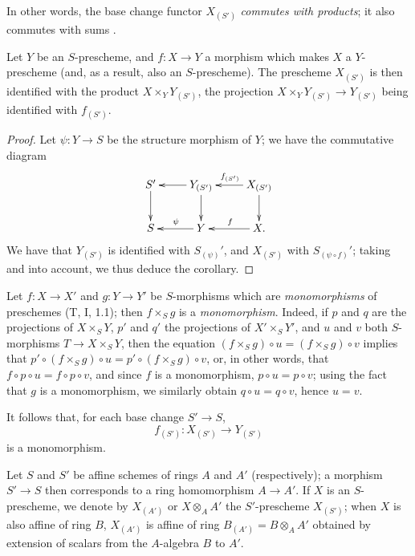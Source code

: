 In other words, the base change functor $X_{(S')}$ \emph{commutes with
products}; it also commutes with sums .

\begin{cor}[3.3.11]
\label{1.3.3.11}
Let $Y$ be an $S$-prescheme, and $f:X\to Y$ a morphism which makes $X$ a
$Y$-prescheme (and, as a result, also an $S$-prescheme). The prescheme $X_{(S')}$
is then identified with the product $X\times_Y Y_{(S')}$, the projection
$X\times_Y Y_{(S')}\to Y_{(S')}$ being identified with $f_{(S')}$.
\end{cor}

\begin{proof}
\label{proof-1.3.3.11}
Let $\psi:Y\to S$ be the structure morphism of $Y$; we have the commutative
diagram
\[
  \xymatrix{
    S'\ar[d] &
    Y_{(S')}\ar[l]\ar[d] &
    X_{(S')}\ar[l]_{f_{(S')}}\ar[d]\\
    S &
    Y\ar[l]_\psi &
    X\ar[l]_f.
  }
\]
We have that $Y_{(S')}$ is identified with $S_{(\psi)}'$, and $X_{(S')}$ with
$S_{(\psi\circ f)}'$; taking  and
 into account, we thus deduce the corollary.
\end{proof}

\begin{env}[3.3.12]
\label{1.3.3.12}
Let $f:X\to X'$ and $g:Y\to Y'$ be $S$-morphisms which are \emph{monomorphisms}
of preschemes (T, I, 1.1); then $f\times_S g$ is a \emph{monomorphism}. Indeed,
if $p$ and $q$ are the projections of $X\times_S Y$, $p'$ and $q'$ the projections of
$X'\times_S Y'$, and $u$ and $v$ both $S$-morphisms $T\to X\times_S Y$, then the
equation $(f\times_S g)\circ u=(f\times_S g)\circ v$ implies that
$p'\circ(f\times_S g)\circ u=p'\circ(f\times_S g)\circ v$, or, in other words, that
$f\circ p\circ u=f\circ p\circ v$, and since $f$ is a monomorphism,
$p\circ u=p\circ v$; using the fact that $g$ is a monomorphism, we similarly
obtain $q\circ u=q\circ v$, hence $u=v$.

It follows that, for each base change $S'\to S$,
\[
  f_{(S')}:X_{(S')}\to Y_{(S')}
\]
is a monomorphism.
\end{env}

\begin{env}[3.3.13]
\label{1.3.3.13}
Let $S$ and $S'$ be affine schemes of rings $A$ and $A'$ (respectively); a morphism
$S'\to S$ then corresponds to a ring homomorphism $A\to A'$. If $X$ is an
$S$-prescheme, we denote by $X_{(A')}$ or $X\otimes_A A'$ the $S'$-prescheme
$X_{(S')}$; when $X$ is also affine of ring $B$, $X_{(A')}$ is affine of ring
$B_{(A')}=B\otimes_A A'$ obtained by extension of scalars from the $A$-algebra
$B$ to $A'$.
\end{env}

